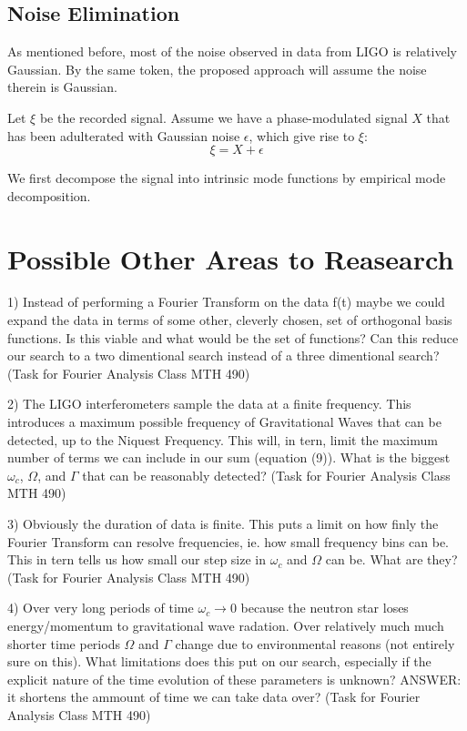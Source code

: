 \documentclass[twocolumn, groupedaddress]{revtex4-1}
\begin{document}
\subsection{Noise Elimination}
As mentioned before, most of the noise observed in data from LIGO is relatively Gaussian. By the same token, the proposed approach will assume the noise therein is Gaussian.

Let $\xi$ be the recorded signal. Assume we have a phase-modulated signal $X$ that has been adulterated with Gaussian noise $\epsilon$, which give rise to $\xi$:
\begin{equation}
\xi = X + \epsilon
\end{equation}

We first decompose the signal into intrinsic mode functions by empirical mode decomposition. 

\section{Possible Other Areas to Reasearch}
1) Instead of performing a Fourier Transform on the data f(t) maybe we could expand the data in terms of some other, cleverly chosen, set of orthogonal basis functions.  Is this viable and what would be the set of functions?  Can this reduce our search to a two dimentional search instead of a three dimentional search? (Task for Fourier Analysis Class MTH 490)

2) The LIGO interferometers sample the data at a finite frequency.  This introduces a maximum possible frequency of Gravitational Waves that can be detected, up to the Niquest Frequency.  This will, in tern, limit the maximum number of terms we can include in our sum (equation (9)).  What is the biggest $\omega_c$, $\Omega$, and $\Gamma$ that can be reasonably detected? (Task for Fourier Analysis Class MTH 490)

3) Obviously the duration of data is finite.  This puts a limit on how finly the Fourier Transform can resolve frequencies, ie. how small frequency bins can be.  This in tern tells us how small our step size in $\omega_c$ and $\Omega$ can be.  What are they? (Task for Fourier Analysis Class MTH 490)

4) Over very long periods of time $\omega_c \to 0$ because the neutron star loses energy/momentum to gravitational wave radation.  Over relatively much much shorter time periods $\Omega$ and $\Gamma$ change due to environmental reasons (not entirely sure on this).  What limitations does this put on our search, especially if the explicit nature of the time evolution of these parameters is unknown? ANSWER: it shortens the ammount of time we can take data over? (Task for Fourier Analysis Class MTH 490)
\end{document}

